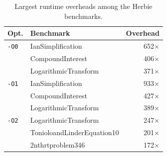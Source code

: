 \begin{table}
  \caption{Largest runtime overheads among the Herbie benchmarks.}
  \label{tab:herbie_worst}
  \centering
  \small
  \begin{tabular}{llr}
    \toprule
    Opt. & Benchmark & Overhead \\
    \midrule
    \texttt{-O0}
      & IanSimplification
      & 652$\times$ \\
    & CompoundInterest
      & 406$\times$ \\
    & LogarithmicTransform
      & 371$\times$ \\
    \midrule
    \texttt{-O1}
      & IanSimplification
      & 933$\times$ \\
    & CompoundInterest
      & 427$\times$ \\
    & LogarithmicTransform
      & 389$\times$ \\
    \midrule
    \texttt{-O2}
      & LogarithmicTransform
      & 247$\times$ \\
    & TonioloandLinderEquation10
      & 201$\times$ \\
    & 2nthrtproblem346
      & 172$\times$ \\
    \bottomrule
  \end{tabular}
\end{table}
